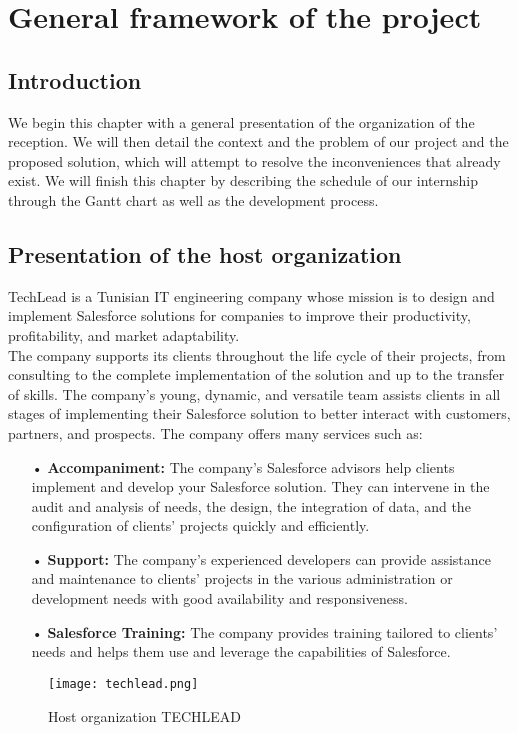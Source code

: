

\chapter{General framework of the project}%


\section*{Introduction}
We begin this chapter with a general presentation of the organization
of the reception. We will then detail the context and the problem of our project and
the proposed solution, which will attempt to resolve the inconveniences
that already exist. We will finish this chapter by describing
the schedule of our internship through the Gantt chart as well as the
development process.\\

\section{Presentation of the host organization}
TechLead is a Tunisian IT engineering company whose mission is to design and implement Salesforce solutions for companies to improve their productivity, profitability, and market adaptability.\\
The company supports its clients throughout the life cycle of their projects, from consulting to the complete implementation of the solution and up to the transfer of skills. The company's young, dynamic, and versatile team assists clients in all stages of implementing their Salesforce solution to better interact with customers, partners, and prospects.
The company offers many services such as:
\begin{itemize}
\item[•] \textbf{Accompaniment:} The company's Salesforce advisors help clients implement and develop your Salesforce solution. They can intervene in the audit and analysis of needs, the design, the integration of data, and the configuration of clients' projects quickly and efficiently.
\item[•] \textbf{Support:} The company's experienced developers can provide assistance and maintenance to clients' projects in the various administration or development needs with good availability and responsiveness.
\item[•] \textbf{Salesforce Training:} The company provides training tailored to clients' needs and helps them use and leverage the capabilities of Salesforce.
\end{itemize}
\begin{figure}[H]%
    \center   
    \texttt{[image: techlead.png]}
    \caption*{Host organization TECHLEAD}
\end{figure}



